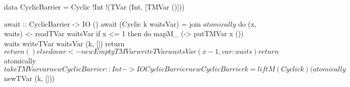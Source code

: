 data CyclicBarrier = Cyclic !Int !(TVar (Int, [TMVar ()]))

await :: CyclicBarrier -> IO ()
await (Cyclic k waitsVar) = join $ atomically $ do
	(x, waits) <- readTVar waitsVar
	if x <= 1 then do
		mapM_ (\x -> putTMVar x ()) waits
		writeTVar waitsVar (k, [])
		return $ return ()
	  else do
	  	var <- newEmptyTMVar
	  	writeTVar waitsVar (x-1,var:waits)
	  	return $ atomically $ takeTMVar var

newCyclicBarrier :: Int -> IO CyclicBarrier
newCyclicBarrier k = liftM (Cyclic k) (atomically $ newTVar (k, []))
